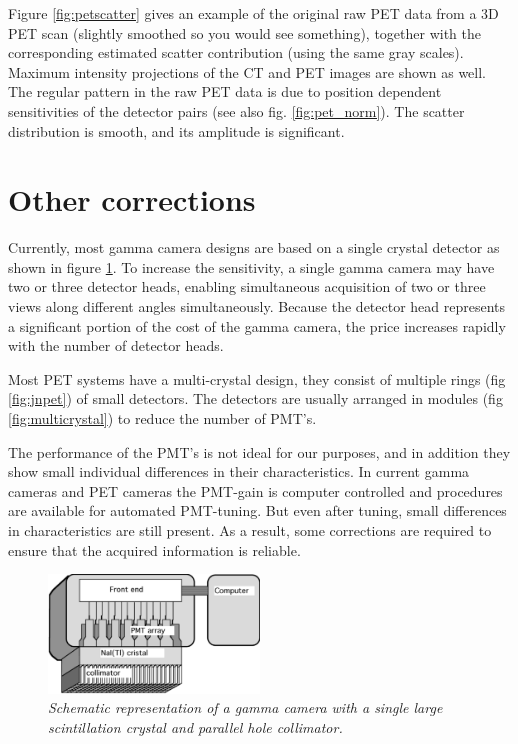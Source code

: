\documentclass[11pt,oneside]{book}
\begin{document}
Figure \ref{fig:petscatter} gives an example of the original raw PET
data from a 3D PET scan (slightly smoothed so you would see
something), together with the corresponding estimated scatter
contribution (using the same gray scales). Maximum intensity
projections of the CT and PET images are shown as well. The regular
pattern in the raw PET data is due to position dependent sensitivities
of the detector pairs (see also fig. \ref{fig:pet_norm}). The scatter
distribution is smooth, and its amplitude is significant.


\section{Other corrections} \label{sec:corrections}
Currently, most gamma camera designs are based on a single crystal detector
as shown in figure \ref{fig:gammacamera}. To increase the sensitivity, a
single gamma camera may have two or three detector heads, enabling
simultaneous acquisition of two or three views along different angles
simultaneously. Because the detector head represents a significant portion of
the cost of the gamma camera, the price increases rapidly with the number of
detector heads.

Most PET systems have a multi-crystal design, they consist of multiple rings
(fig \ref{fig:jnpet}) of small detectors. The detectors are usually arranged
in modules (fig \ref{fig:multicrystal}) to reduce the number of PMT's.

The performance of the PMT's is not ideal for our purposes, and in addition
they show small individual differences in their characteristics. In current
gamma cameras and PET cameras the PMT-gain is computer controlled and
procedures are available for automated PMT-tuning. But even after tuning,
small differences in characteristics are still present.  As a result, some
corrections are required to ensure that the acquired information is reliable.

\begin{figure}[tb]
\centering
\includegraphics[width=0.5\textwidth]{figs/fig_jngamma.pdf}
\caption{\label{fig:gammacamera} \emph{Schematic representation of a gamma
camera with a single large scintillation crystal and parallel hole
collimator.}}
\end{figure}
\end{document}
